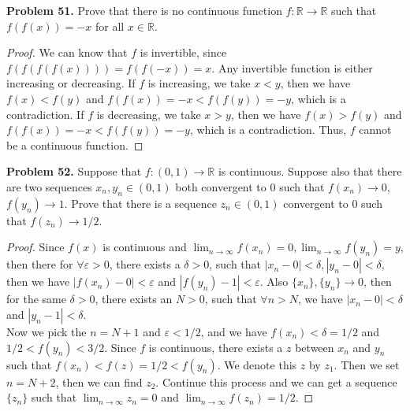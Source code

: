 \documentclass[12pt,leqno]{amsart}
\begin{document}
\medskip

\noindent
{\bf Problem 51.}
Prove that there is no continuous function $f:\mathbb{R}\to\mathbb{R}$ such that $f(f(x)) = -x$ for all $x\in\mathbb{R}$.
\begin{proof}
We can know that $f$ is invertible, since $f(f(f(f(x)))) = f(f(-x)) = x$. Any invertible function is either increasing or decreasing. If $f$ is increasing, we take $x<y$, then we have $f(x)<f(y)$ and $f(f(x))=-x<f(f(y))=-y$, which is a contradiction. If $f$ is decreasing, we take $x>y$, then we have $f(x)>f(y)$ and $f(f(x))=-x<f(f(y))=-y$, which is a contradiction. Thus, $f$ cannot be a continuous function.
\end{proof}

\medskip

\noindent
{\bf Problem 52.}
Suppose that $f:(0,1)\to\mathbb{R}$ is continuous. Suppose also that there are two sequences $x_n,y_n\in (0,1)$ both convergent to $0$ such that $f(x_n)\to 0$, $f(y_n)\to 1$. Prove that there is a sequence $z_n\in (0,1)$ convergent to $0$ such that $f(z_n)\to 1/2$.
\begin{proof}
Since $f(x)$ is continuous and $\lim_{n\to\infty}f(x_n)=0, \lim_{n\to\infty}f(y_n)=y$, then there for $\forall \varepsilon >0$, there exists a $\delta>0$, such that $|x_n-0|<\delta, |y_n-0|<\delta$, then we have $|f(x_n)-0|<\varepsilon$ and $|f(y_n)-1|<\varepsilon$. Also $\{x_n\}, \{y_n\}\to 0$, then for the same $\delta >0$, there exists an $N>0$, such that $\forall n>N$, we have $|x_n-0|<\delta$ and $|y_n-1|<\delta$.\\
\hspace*{3em}Now we pick the $n=N+1$ and $\varepsilon<1/2$, and we have $f(x_n)<\delta = 1/2$ and $1/2<f(y_n)<3/2$. Since $f$ is continuous, there exists a $z$ between $x_n$ and $y_n$ such that $f(x_n)<f(z)=1/2<f(y_n)$. We denote this $z$ by $z_1$. Then we set $n=N+2$, then we can find $z_2$. Continue this process and we can get a sequence $\{z_n\}$ such that $\lim_{n\to\infty}z_n = 0$ and $\lim_{n\to\infty}f(z_n) = 1/2$.
\end{proof}

\medskip
\end{document}

